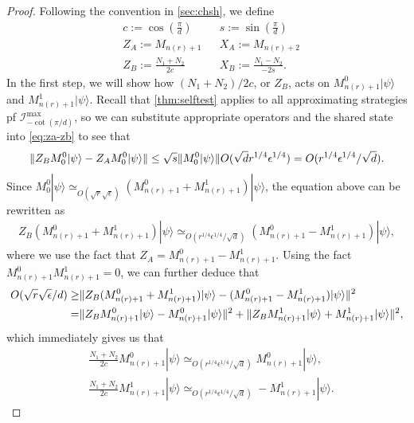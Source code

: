 \documentclass[11pt,letterpaper]{article}
\newcommand{\ket}[1]{|#1\rangle}
\DeclarePairedDelimiter{\norm}{\lVert}{\rVert}
\newcommand{\1}{\mathbb{1}}
\newcommand{\nr}{n(r)}
\newcommand{\I}{\mathcal{I}}
\newcommand{\se}{\sqrt{\epsilon}}
\newcommand{\qe}{\epsilon^{1/4}}
\newcommand{\sd}{\sqrt{d}}
\newcommand{\sr}{\sqrt{r}}
\newcommand{\qr}{r^{1/4}}
\newcommand{\appd}[1]{\simeq_{#1}}
\theoremstyle{definition}
\begin{document}
\begin{proof}
	Following the convention in \cref{sec:chsh}, we define
	\begin{align*}
		& c := \cos(\frac{\pi}{d}) && s := \sin(\frac{\pi}{d}) \\
		&Z_A  := M_{\nr+1} && X_A := M_{\nr+2} \\
		&Z_B := \frac{N_1+N_2}{2c} && X_B := \frac{N_1-N_2}{-2s}.
	\end{align*}
	In the first step, we will show how $(N_1 + N_2)/2c$, or $Z_B$,
	acts on $M_{\nr+1}^0\ket{\psi}$ and 
	$M_{\nr+1}^1 \ket{\psi}$.
	Recall that \cref{thm:selftest} applies
	to all approximating strategies pf $\I_{-\cot(\pi/d)}^{\max}$, so
	we can substitute appropriate operators
	and the shared state into
    \cref{eq:za-zb} to see that
	\begin{align*}
		\norm{Z_B M_0^0 \ket{\psi} - Z_AM_0^0 \ket{\psi}} \leq 
		\sqrt{s}\norm{M_0^0 \ket{\psi}} O(\sd \qr \qe)
		= O(\qr \qe/ \sd ).
	\end{align*}
	Since $M_0^0 \ket{\psi} \appd{O(\sr \se)} (M_{\nr+1}^0 + M_{\nr+1}^1) \ket{\psi}$,
	the equation above can be rewritten as 
	\begin{align*}
		Z_B (M_{\nr+1}^0 + M_{\nr+1}^1) \ket{\psi} \appd{O(\qr \qe / \sd )} (M_{\nr+1}^0 - M_{\nr+1}^1) \ket{\psi},
	\end{align*}
	where we use the fact that $Z_A = M_{\nr+1}^0 - M_{\nr+1}^1$.
	Using the fact $M_{\nr+1}^0 M_{\nr+1}^1 = 0$, we can 
	further deduce that
	\begin{align*}
		O(\sr \se /d) \geq &\norm{Z_B (M_{\nr+1}^0 + M_{\nr+1}^1) \ket{\psi} - (M_{\nr+1}^0 - M_{\nr+1}^1) \ket{\psi}}^2\\
		=&\norm{ Z_BM_{\nr+1}^0 \ket{\psi} - M_{\nr+1}^0\ket{\psi}}^2 + \norm{ Z_BM_{\nr+1}^1 \ket{\psi} + M_{\nr+1}^1\ket{\psi}}^2,
	\end{align*}
	which immediately gives us that 
	\begin{align}
	    \label{eq:n1+n20}
		&\frac{N_1+N_2}{2c} M_{\nr+1}^0\ket{\psi} \appd{O( \qr \qe /\sd)} M_{\nr+1}^0 \ket{\psi},\\
		\label{eq:n1+n21}
		&\frac{N_1+N_2}{2c} M_{\nr+1}^1\ket{\psi} \appd{O( \qr \qe /\sd)} -M_{\nr+1}^1 \ket{\psi}.
	\end{align}
	

\end{proof}
\end{document}
